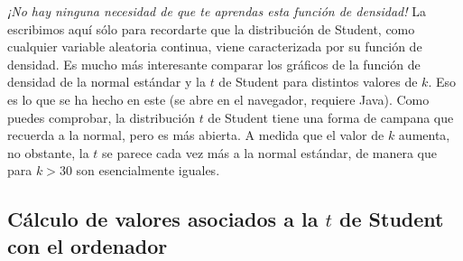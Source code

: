 \begin{itemize}
       {\em ¡No hay ninguna necesidad de que te aprendas esta función de densidad!} La escribimos aquí sólo para recordarte que la distribución de Student, como cualquier variable aleatoria continua, viene caracterizada por su función de densidad. Es mucho más interesante comparar los gráficos de la función de densidad de la normal estándar y la $t$ de Student para distintos valores de $k$. Eso es lo que se ha hecho en este  (se abre en el navegador, requiere Java). Como puedes comprobar, la distribución $t$ de Student tiene una forma de campana que recuerda a la normal, pero es más abierta. A medida que el valor de $k$ aumenta, no obstante, la $t$ se parece cada vez más a la normal estándar, de manera que para $k>30$ son esencialmente iguales.
    \end{itemize}

    \subsection*{Cálculo de valores asociados a la $t$ de Student con el ordenador}

